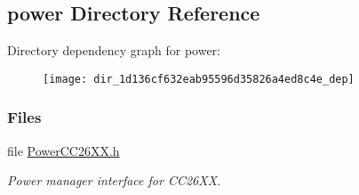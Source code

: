 \subsection{power Directory Reference}
\label{dir_1d136cf632eab95596d35826a4ed8c4e}
Directory dependency graph for power\+:
\nopagebreak
\begin{figure}[H]
\begin{center}
\leavevmode
\texttt{[image: dir\_1d136cf632eab95596d35826a4ed8c4e\_dep]}
\end{center}
\end{figure}
\subsubsection*{Files}
\begin{DoxyCompactItemize}
\item 
file \hyperlink{_power_c_c26_x_x_8h}{Power\+C\+C26\+X\+X.\+h}
\begin{DoxyCompactList}\small\item\em Power manager interface for C\+C26\+X\+X. \end{DoxyCompactList}\end{DoxyCompactItemize}
